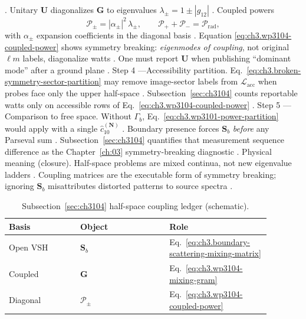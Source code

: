\cite{harrington2001}.
Unitary \(\mathbf{U}\) diagonalizes \(\mathbf{G}\) to eigenvalues \(\lambda_{\pm}=1\pm|g_{12}|\) \cite{hansen1988}. Coupled powers
\begin{equation}
\label{eq:ch3.wp3104-coupled-power}
\mathcal{P}_{\pm}
=
|\alpha_{\pm}|^{2}\,\lambda_{\pm},
\qquad
\mathcal{P}_{+}+\mathcal{P}_{-}
=
\mathcal{P}_{\mathrm{rad}},
\end{equation}
with \(\alpha_{\pm}\) expansion coefficients in the diagonal basis \cite{poynting1884}. Equation
\eqref{eq:ch3.wp3104-coupled-power} shows symmetry breaking: \emph{eigenmodes of coupling}, not original \(\ell m\) labels, diagonalize watts
\cite{harrington2001}. One must report \(\mathbf{U}\) when publishing ``dominant mode'' after a ground plane
\cite{stratton1941}.
Step 4 ---Accessibility partition. Eq.~\eqref{eq:ch3.broken-symmetry-sector-partition} may remove image-sector labels from \(\mathcal{L}_{\mathrm{acc}}\) when probes face only
the upper half-space \cite{harrington2001}. Subsection~\ref{sec:ch3104} counts reportable watts only on accessible rows of
Eq.~\eqref{eq:ch3.wp3104-coupled-power} \cite{hansen1988}.
Step 5 ---Comparison to free space. Without \(\Gamma_{b}\), Eq.~\eqref{eq:ch3.wp3101-power-partition} would apply with a single \(\widehat{c}_{10}^{(\mathbf{N})}\)
\cite{hansen1988}. Boundary presence forces \(\mathbf{S}_{b}\) \emph{before} any Parseval sum \cite{harrington2001}.
Subsection~\ref{sec:ch3104} quantifies that measurement sequence difference as the Chapter~\ref{ch:03} symmetry-breaking diagnostic
\cite{stratton1941}.
Physical meaning (closure). Half-space problems are mixed continua, not new eigenvalue ladders \cite{jackson1999}. Coupling matrices are the executable form
of symmetry breaking; ignoring \(\mathbf{S}_{b}\) misattributes distorted patterns to source spectra \cite{harrington2001}.
\begin{table}[t]
\centering
\caption{Subsection~\ref{sec:ch3104} half-space coupling ledger (schematic).}
\label{tab:ch3.3104-coupling-ledger}
\small
\begin{tabular}{@{}p{0.24\linewidth}p{0.30\linewidth}p{0.34\linewidth}@{}}
\toprule
Basis & Object & Role \\
\midrule
Open VSH & $\mathbf{S}_{b}$ & Eq.~\eqref{eq:ch3.boundary-scattering-mixing-matrix} \\
Coupled & $\mathbf{G}$ & Eq.~\eqref{eq:ch3.wp3104-mixing-gram} \\
Diagonal & $\mathcal{P}_{\pm}$ & Eq.~\eqref{eq:ch3.wp3104-coupled-power} \\
\bottomrule
\end{tabular}
\end{table}
